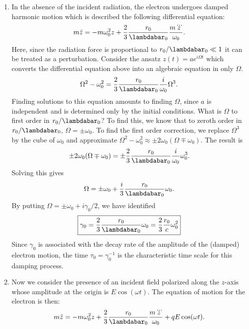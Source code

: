 \documentclass{article}
\theoremstyle{definition}
\newcommand{\f}[2]{\frac{#1}{#2}}
\begin{document}
\begin{enumerate}[label=\alph*)]
	\item In the absence of the incident radiation, the electron undergoes damped harmonic motion which is 		described the following differential equation:
	\begin{align*}
	m\ddot{z} = - m\omega_0^2 z + \f{2}{3} \f{r_0}{\lambdabar_0} \f{m \dddot{z}}{\omega_0}.
	\end{align*}
	Here, since the radiation force is proportional to $r_0/\lambdabar_0 \ll 1$ it can be treated as a perturbation. Consider the ansatz $z(t) = ae^{i\Omega t}$ which converts the differential equation above into an algebraic equation in only $\Omega$. 
	\begin{align*}
	\Omega^2  - \omega_0^2 = \f{2}{3} \f{r_0}{\lambdabar_0 } \f{i}{\omega_0} \Omega^3.
	\end{align*}
	Finding solutions to this equation amounts to finding $\Omega$, since $a$ is independent and is determined only by the initial conditions. What is $\Omega$ to first order in $r_0/\lambdabar_0$? To find this, we know that to zeroth order in $r_0/\lambdabar_0$, $\Omega = \pm \omega_0$. To find the first order correction, we replace $\Omega^3$ by the cube of $\omega_0$ and approximate $\Omega^2 - \omega_0^2 \approx  \pm 2 \omega_0 (\Omega \mp \omega_0)$. The result is 
	\begin{align*}
	\pm 2 \omega_0 (\Omega \mp \omega_0) = \pm \f{2}{3} \f{r_0}{\lambdabar_0} \f{i}{\omega_0} \omega_0^3.
	\end{align*}
	Solving this gives
	\begin{align*}
	\Omega =  \pm \omega_0 + \f{i}{3} \f{r_0}{\lambdabar_0}  \omega_0.
	\end{align*}
	By putting $\Omega =  \pm \omega_0 + i\gamma_0/2$, we have identified 
	\begin{align*}
	\boxed{\gamma_0 = \f{2}{3} \f{r_0}{\lambdabar_0}  \omega_0  = \f{2}{3} \f{r_0}{c} \omega_0^2}
	\end{align*}
	Since $\gamma_0$ is associated with the decay rate of the amplitude of the (damped) electron motion, the time $\tau_0 = \gamma_0^{-1}$ is the characteristic time scale for this damping process.  
	
	
	\item Now we consider the presence of an incident field polarized along the $z$-axis whose amplitude at the origin is $E \cos (\omega t)$. The equation of motion for the electron is then:
	\begin{align*}
	m \ddot{z} = -m \omega_0^2 z  + \f{2}{3} \f{r_0}{\lambdabar_0} \f{m \dddot{z}}{\omega_0} + qE\cos(\omega t).
	\end{align*}
	

\end{enumerate}
\end{document}
